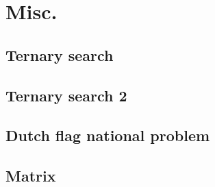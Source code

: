 \section{Misc.}

\subsection{Ternary search}

\subsection{Ternary search 2}

\subsection{Dutch flag national problem}

\subsection{Matrix}

